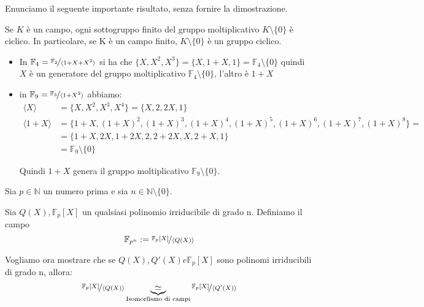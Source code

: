 \documentclass[../main.tex]{subfiles}
\begin{document}
Enunciamo il seguente importante risultato, senza fornire la dimostrazione.

\begin{proposition}
    Se $K$ è un campo, ogni sottogruppo finito del gruppo moltiplicativo $K \setminus \{0\}$ è ciclico. In particolare, se K è un campo finito, $K \setminus \{0\}$ è un gruppo ciclico.
\end{proposition}

\begin{example}
    \begin{itemize}
        \item In $\mathbb{F}_4 = \nicefrac{\mathbb{F}_2}{\langle1 + X + X^2\rangle}$ si ha che $\{ X, X^2, X^3\} = \{ X, 1 + X, 1\} = \mathbb{F}_4 \setminus \{0\}$ quindi $X$ è un generatore del gruppo moltiplicativo $\mathbb{F}_4 \setminus \{0\}$, l'altro è $1 + X$
        \item in $\mathbb{F}_9 = \nicefrac{\mathbb{F}_3}{\langle1 + X^2\rangle}$ abbiamo:
              \begin{align*}
                  \langle X\rangle    & = \{X, X^2, X^3, X^4\} = \{X, 2, 2X,1\}                                                    \\
                  \langle1 + X\rangle & = \{1 + X, (1 + X)^2, (1 + X)^3, (1 + X)^4, (1 + X)^5, (1 + X)^6, (1 + X)^7, (1 + X)^8\} = \\
                                      & = \{1 + X, 2X, 1 + 2X, 2, 2 + 2X, X, 2 + X, 1 \}                                           \\
                                      & = \mathbb{F}_9 \setminus \{0\}
              \end{align*}

              Quindi $1 + X$ genera il gruppo moltiplicativo $\mathbb{F}_9 \setminus \{0\}$.
    \end{itemize}
\end{example}

Sia $p \in \mathbb{N}$ un numero prima e sia $n \in \mathbb{N} \setminus \{0\}$.

Sia $Q(X), \mathbb{F}_p[X]$ un qualsiasi polinomio irriducibile di grado n. Definiamo il campo
\begin{equation*}
    \mathbb{F}_{p^n} := \nicefrac{\mathbb{F}_p[X]}{\langle Q(X)\rangle}
\end{equation*}

Vogliamo ora mostrare che se $Q(X), Q'(X) e \mathbb{F}_p[X]$ sono polinomi irriducibili di grado n, allora:
\begin{equation*}
    \nicefrac{\mathbb{F}_p[X]}{\langle Q(X)\rangle} \underbrace{\simeq}_{\text{Isomorfismo di campi}} \nicefrac{\mathbb{F}_p[X]}{\langle Q'(X)\rangle}
\end{equation*}
\end{document}
